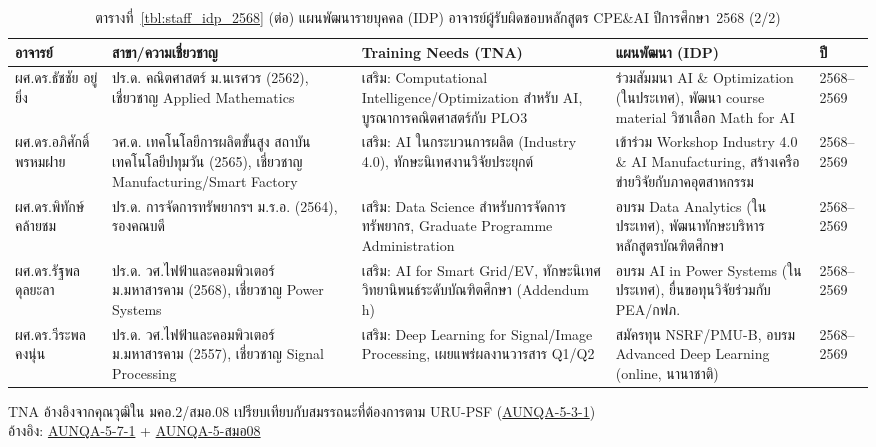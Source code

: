 \begin{table}[htbp]
  \centering
  \caption*{ตารางที่~\ref{tbl:staff_idp_2568} (ต่อ) แผนพัฒนารายบุคคล (IDP) อาจารย์ผู้รับผิดชอบหลักสูตร CPE\&AI ปีการศึกษา~2568 (2/2)}
  \begingroup
  \footnotesize
  \setlength{\tabcolsep}{3pt}
  \renewcommand{\arraystretch}{1.2}
  \begin{tabularx}{\linewidth}{|>{\raggedright\arraybackslash}p{3.0cm}|>{\raggedright\arraybackslash}p{2.6cm}|>{\raggedright\arraybackslash}X|>{\raggedright\arraybackslash}X|l|}
    \hline
    \textbf{อาจารย์} & \textbf{สาขา/ความเชี่ยวชาญ} & \textbf{Training Needs (TNA)} & \textbf{แผนพัฒนา (IDP)} & \textbf{ปี} \\
    \hline
    ผศ.ดร.ธัชชัย อยู่ยิ่ง &
    ปร.ด. คณิตศาสตร์ ม.นเรศวร (2562), เชี่ยวชาญ Applied Mathematics &
    เสริม: Computational Intelligence/Optimization สำหรับ AI, บูรณาการคณิตศาสตร์กับ PLO3 &
    ร่วมสัมมนา AI \& Optimization (ในประเทศ), พัฒนา course material วิชาเลือก Math for AI &
    2568--2569 \\
    \hline
    ผศ.ดร.อภิศักดิ์ พรหมฝาย &
    วศ.ด. เทคโนโลยีการผลิตขั้นสูง สถาบันเทคโนโลยีปทุมวัน (2565), เชี่ยวชาญ Manufacturing/Smart Factory &
    เสริม: AI ในกระบวนการผลิต (Industry 4.0), ทักษะนิเทศงานวิจัยประยุกต์ &
    เข้าร่วม Workshop Industry 4.0 \& AI Manufacturing, สร้างเครือข่ายวิจัยกับภาคอุตสาหกรรม &
    2568--2569 \\
    \hline
    ผศ.ดร.พิทักษ์ คล้ายชม &
    ปร.ด. การจัดการทรัพยากรฯ ม.ร.อ. (2564), รองคณบดี &
    เสริม: Data Science สำหรับการจัดการทรัพยากร, Graduate Programme Administration &
    อบรม Data Analytics (ในประเทศ), พัฒนาทักษะบริหารหลักสูตรบัณฑิตศึกษา &
    2568--2569 \\
    \hline
    ผศ.ดร.รัฐพล ดุลยะลา &
    ปร.ด. วศ.ไฟฟ้าและคอมพิวเตอร์ ม.มหาสารคาม (2568), เชี่ยวชาญ Power Systems &
    เสริม: AI for Smart Grid/EV, ทักษะนิเทศวิทยานิพนธ์ระดับบัณฑิตศึกษา (Addendum h) &
    อบรม AI in Power Systems (ในประเทศ), ยื่นขอทุนวิจัยร่วมกับ PEA/กฟภ. &
    2568--2569 \\
    \hline
    ผศ.ดร.วีระพล คงนุ่น &
    ปร.ด. วศ.ไฟฟ้าและคอมพิวเตอร์ ม.มหาสารคาม (2557), เชี่ยวชาญ Signal Processing &
    เสริม: Deep Learning for Signal/Image Processing, เผยแพร่ผลงานวารสาร Q1/Q2 &
    สมัครทุน NSRF/PMU-B, อบรม Advanced Deep Learning (online, นานาชาติ) &
    2568--2569 \\
    \hline
  \end{tabularx}
  \endgroup
  \begin{flushleft}
    \footnotesize TNA อ้างอิงจากคุณวุฒิใน มคอ.2/สมอ.08 เปรียบเทียบกับสมรรถนะที่ต้องการตาม URU-PSF (\hyperlink{ref:AUNQA-5-3-1}{AUNQA-5-3-1}) \\
    อ้างอิง: \hyperlink{ref:AUNQA-5-7-1}{AUNQA-5-7-1} + \hyperlink{ref:AUNQA-5-สมอ08}{AUNQA-5-สมอ08}
  \end{flushleft}
\end{table}

